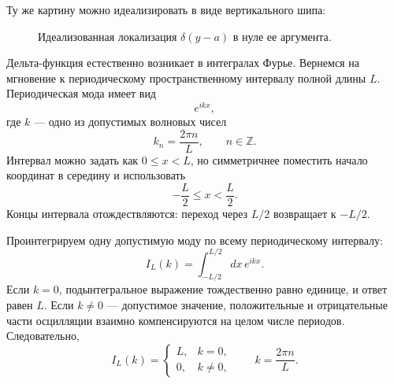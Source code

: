Ту же картину можно идеализировать в виде вертикального шипа:
\begin{figure}[h]
\centering
{}
\caption{Идеализованная локализация \(\delta(y-a)\) в нуле ее аргумента.}
\end{figure}

Дельта-функция естественно возникает в интегралах Фурье. Вернемся на мгновение к периодическому пространственному интервалу полной длины \(L\). Периодическая мода имеет вид
\begin{equation}
e^{ikx},
\end{equation}
где \(k\) — одно из допустимых волновых чисел
\begin{equation}
k_n=\frac{2\pi n}{L},
\qquad n\in\mathbb Z.
\end{equation}
Интервал можно задать как \(0\leq x<L\), но симметричнее поместить начало координат в середину и использовать
\begin{equation}
-\frac L2\leq x<\frac L2.
\end{equation}
Концы интервала отождествляются: переход через \(L/2\) возвращает к \(-L/2\).

Проинтегрируем одну допустимую моду по всему периодическому интервалу:
\begin{equation}
I_L(k)=\int_{-L/2}^{L/2}dx\,e^{ikx}.
\end{equation}
Если \(k=0\), подынтегральное выражение тождественно равно единице, и ответ равен \(L\). Если \(k\neq0\) — допустимое значение, положительные и отрицательные части осцилляции взаимно компенсируются на целом числе периодов. Следовательно,
\begin{equation}
I_L(k)=
\begin{cases}
L,&k=0,\\[4pt]
0,&k\neq0,
\end{cases}
\qquad
k=\frac{2\pi n}{L}.
\end{equation}

